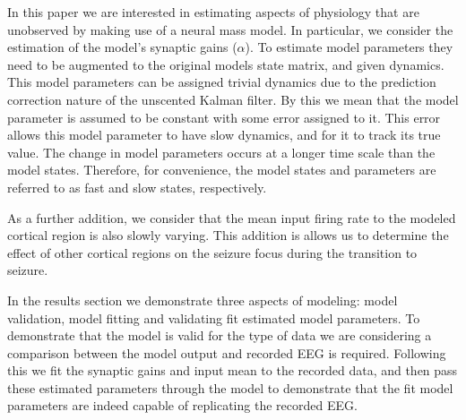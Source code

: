 



In this paper we are interested in estimating aspects of physiology that are unobserved by making use of a neural mass model. In particular, we consider the estimation of the model's synaptic gains ($\alpha$). To estimate model parameters they need to be augmented to the original models state matrix, and given dynamics. This model parameters can be assigned trivial dynamics due to the prediction correction nature of the unscented Kalman filter. By this we mean that the model parameter is assumed to be constant with some error assigned to it. This error allows this model parameter to have slow dynamics, and for it to track its true value. The change in model parameters occurs at a longer time scale than the model states. Therefore, for convenience, the model states and parameters are referred to as fast and slow states, respectively. 

As a further addition, we consider that the mean input firing rate to the modeled cortical region is also slowly varying. This addition is allows us to determine the effect of other cortical regions on the seizure focus during the transition to seizure.

In the results section we demonstrate three aspects of modeling: model validation, model fitting and validating fit estimated model parameters. To demonstrate that the model is valid for the type of data we are considering a comparison between the model output and recorded EEG is required. Following this we fit the synaptic gains and input mean to the recorded data, and then pass these estimated parameters through the model to demonstrate that the fit model parameters are indeed capable of replicating the recorded EEG.

